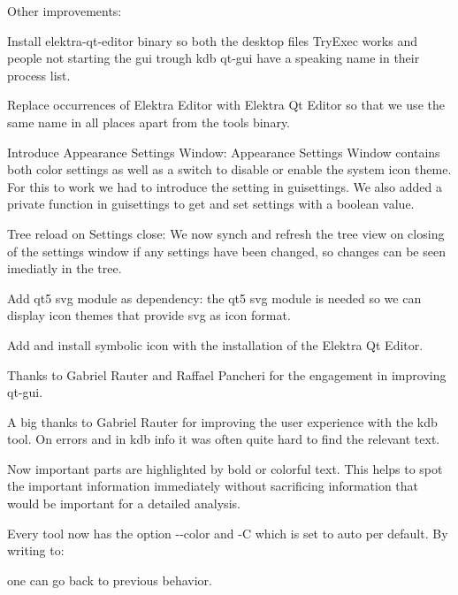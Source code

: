 Other improvements\+:


\begin{DoxyItemize}
\item Install {\ttfamily elektra-\/qt-\/editor} binary so both the desktop files Try\+Exec works and people not starting the gui trough {\ttfamily kdb qt-\/gui} have a speaking name in their process list.
\item Replace occurrences of {\ttfamily Elektra Editor} with {\ttfamily Elektra Qt Editor} so that we use the same name in all places apart from the tools binary.
\item Introduce Appearance Settings Window\+: Appearance Settings Window contains both color settings as well as a switch to disable or enable the system icon theme. For this to work we had to introduce the setting in {\ttfamily guisettings}. We also added a private function in {\ttfamily guisettings} to get and set settings with a boolean value.
\item Tree reload on Settings close\+: We now synch and refresh the tree view on closing of the settings window if any settings have been changed, so changes can be seen imediatly in the tree.
\item Add qt5 svg module as dependency\+: the qt5 svg module is needed so we can display icon themes that provide svg as icon format.
\item Add and install symbolic icon with the installation of the Elektra Qt Editor.
\end{DoxyItemize}

Thanks to Gabriel Rauter and Raffael Pancheri for the engagement in improving qt-\/gui.

A big thanks to Gabriel Rauter for improving the user experience with the kdb tool. On errors and in {\ttfamily kdb info} it was often quite hard to find the relevant text.

Now important parts are highlighted by bold or colorful text. This helps to spot the important information immediately without sacrificing information that would be important for a detailed analysis.

Every tool now has the option {\ttfamily -\/-\/color} and {\ttfamily -\/C} which is set to {\ttfamily auto} per default. By writing to\+:




one can go back to previous behavior.



